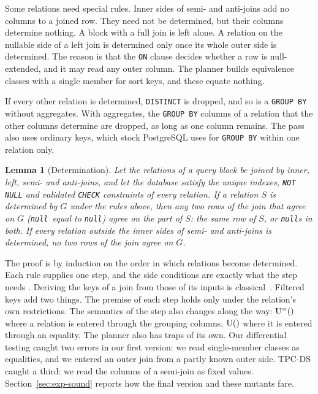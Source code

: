 \documentclass[conference]{IEEEtran}
\newtheorem{lemma}[theorem]{Lemma}
\theoremstyle{definition}
\newcommand{\sql}[1]{\texttt{#1}}
\newcommand{\nul}{\texttt{null}}
\newcommand{\U}[1]{\mathrm{U}(#1)}
\newcommand{\Ueq}[1]{\mathrm{U}^{=}(#1)}
\newif\ifextended
\begin{document}
Some relations need special rules. Inner sides of semi- and anti-joins add no columns to a joined row. They need not be
determined, but their columns determine nothing. A block with a full join is left alone. A relation on the nullable side
of a left join is determined only once its whole outer side is determined. The reason is that the \sql{ON} clause decides
whether a row is null-extended, and it may read any outer column. The planner builds equivalence classes with a single
member for sort keys, and these equate nothing.

If every other relation is determined, \sql{DISTINCT} is dropped, and so is a \sql{GROUP BY} without aggregates. With
aggregates, the \sql{GROUP BY} columns of a relation that the other columns determine are dropped, as long as one column
remains. The pass also uses ordinary keys, which stock PostgreSQL uses for \sql{GROUP BY} within one relation only.
\begin{lemma}[Determination]\label{lem:det}
Let the relations of a query block be joined by inner, left, semi- and anti-joins, and let the
database satisfy the unique indexes, \sql{NOT NULL} and validated \sql{CHECK} constraints of
every relation. If a relation $S$ is determined by $G$ under the rules above, then any two rows of
the join that agree on $G$ (\nul\ equal to \nul) agree on the part of $S$: the same row of $S$,
or \nul s in both. If every relation outside the inner sides of semi- and anti-joins is
determined, no two rows of the join agree on $G$.
\end{lemma}

\noindent The proof is by induction on the order in which relations become determined. Each rule supplies one step,
and the side conditions are exactly what the step needs \ifextended(Appendix~\ref{app:det})\else\cite{EXT}\fi. Deriving
the keys of a join from those of its inputs is classical~\cite{PL94,Dar92,Pau00}. Filtered keys add two things. The
premise of each step holds only under the relation's own restrictions. The semantics of the step also changes along
the way: $\Ueq$ where a relation is entered through the grouping columns, $\U$ where it is entered through an equality. The
planner also has traps of its own. Our differential testing caught two errors in our first version: we read
single-member classes as equalities, and we entered an outer join from a partly known outer side. TPC-DS caught a third:
we read the columns of a semi-join as fixed values. Section~\ref{sec:exp-sound} reports how the final version and these
mutants fare.
\end{document}
